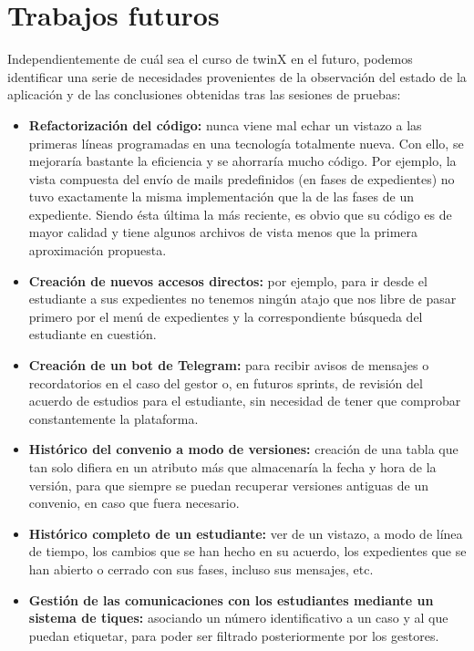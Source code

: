 \section{Trabajos futuros}
\label{sec:trabajosfuturos}

Independientemente de cuál sea el curso de twinX en el futuro, podemos identificar una serie de necesidades provenientes de la observación del estado de la aplicación y de las conclusiones obtenidas tras las sesiones de pruebas:

\begin{itemize}
	\item \textbf{Refactorización del código:} nunca viene mal echar un vistazo a las primeras líneas programadas en una tecnología totalmente nueva. Con ello, se mejoraría bastante la eficiencia y se ahorraría mucho código. Por ejemplo, la vista compuesta del envío de mails predefinidos (en fases de expedientes) no tuvo exactamente la misma implementación que la de las fases de un expediente. Siendo ésta última la más reciente, es obvio que su código es de mayor calidad y tiene algunos archivos de vista menos que la primera aproximación propuesta.
	\item \textbf{Creación de nuevos accesos directos:} por ejemplo, para ir desde el estudiante a sus expedientes no tenemos ningún atajo que nos libre de pasar primero por el menú de expedientes y la correspondiente búsqueda del estudiante en cuestión.
	\item \textbf{Creación de un bot de Telegram:} para recibir avisos de mensajes o recordatorios en el caso del gestor o, en futuros sprints, de revisión del acuerdo de estudios para el estudiante, sin necesidad de tener que comprobar constantemente la plataforma.
	\item \textbf{Histórico del convenio a modo de versiones:} creación de una tabla que tan solo difiera en un atributo más que almacenaría la fecha y hora de la versión, para que siempre se puedan recuperar versiones antiguas de un convenio, en caso que fuera necesario.
	\item \textbf{Histórico completo de un estudiante:} ver de un vistazo, a modo de línea de tiempo, los cambios que se han hecho en su acuerdo, los expedientes que se han abierto o cerrado con sus fases, incluso sus mensajes, etc.
	\item \textbf{Gestión de las comunicaciones con los estudiantes mediante un sistema de tiques:} asociando un número identificativo a un caso y al que puedan etiquetar, para poder ser filtrado posteriormente por los gestores.
\end{itemize}

